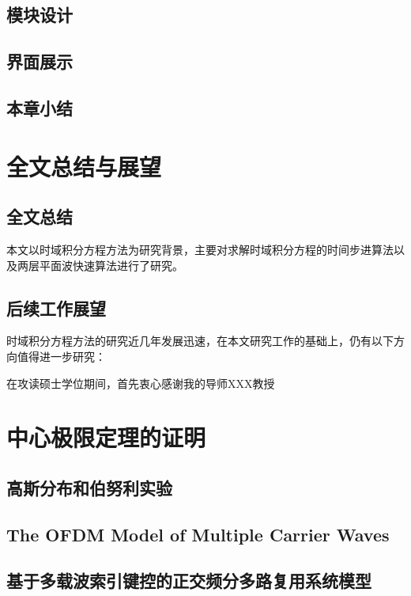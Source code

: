 \documentclass[promaster]{thesis-uestc}
\begin{document}
\section{模块设计}
\section{界面展示}
\section{本章小结}

\chapter{全文总结与展望}

\section{全文总结}
本文以时域积分方程方法为研究背景，主要对求解时域积分方程的时间步进算法以及两层平面波快速算法进行了研究。


\section{后续工作展望}
时域积分方程方法的研究近几年发展迅速，在本文研究工作的基础上，仍有以下方向值得进一步研究：

\thesisacknowledgement
在攻读硕士学位期间，首先衷心感谢我的导师XXX教授


\nocite{*}

%
% 
%
% 
% 
%

\thesisappendix

\chapter{中心极限定理的证明}

\section{高斯分布和伯努利实验}



\thesistranslationoriginal
\section{The OFDM Model of Multiple Carrier Waves}


\thesistranslationchinese

\section{基于多载波索引键控的正交频分多路复用系统模型}
\end{document}
